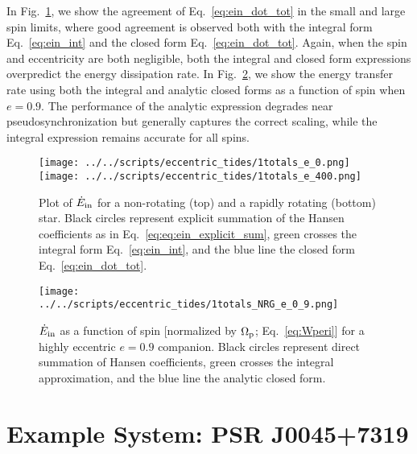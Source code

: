 \documentclass[
        fleqn,
        usenatbib,
    ]{mnras}
\begin{document}
In Fig.~\ref{fig:e0}, we show the agreement of Eq.~\eqref{eq:ein_dot_tot} in the
small and large spin limits, where good agreement is observed both with the
integral form Eq.~\eqref{eq:ein_int} and the closed form
Eq.~\eqref{eq:ein_dot_tot}. Again, when the spin and eccentricity are both
negligible, both the integral and closed form expressions overpredict the energy
dissipation rate. In Fig.~\ref{fig:e_spin}, we show the energy
transfer rate using both the integral and analytic closed forms as a function of
spin when $e = 0.9$. The performance of the analytic expression degrades near
pseudosynchronization but generally captures the correct scaling, while the
integral expression remains accurate for all spins.
\begin{figure}
    \centering
    \texttt{[image: ../../scripts/eccentric\_tides/1totals\_e\_0.png]}
    \texttt{[image: ../../scripts/eccentric\_tides/1totals\_e\_400.png]}
    \caption{Plot of $\dot{E}_{\rm in}$ for a non-rotating (top) and a rapidly
    rotating (bottom) star. Black circles represent explicit summation of the
    Hansen coefficients as in Eq.~\eqref{eq:eq:ein_explicit_sum}, green crosses
    the integral form Eq.~\eqref{eq:ein_int}, and the blue line the closed form
    Eq.~\eqref{eq:ein_dot_tot}. }\label{fig:e0}
\end{figure}
\begin{figure}
    \centering
    \texttt{[image: ../../scripts/eccentric\_tides/1totals\_NRG\_e\_0\_9.png]}
    \caption{$\dot{E}_{\rm in}$ as a function of spin [normalized by
    $\Omega_{\rm p}$; Eq.~\eqref{eq:Wperi}] for a highly eccentric $e = 0.9$
    companion. Black circles represent direct summation of Hansen coefficients,
    green crosses the integral approximation, and the blue line the analytic
    closed form. }\label{fig:e_spin}
\end{figure}

\section{Example System: PSR J0045+7319}\label{s:j00457319}
\end{document}
